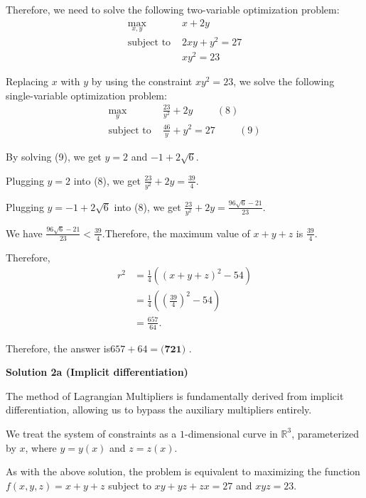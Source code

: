 \begin{enumerate}
 Therefore, we need to solve the following two-variable optimization problem:\begin{align*}\max_{x,y} \ & x + 2y \\\mbox{subject to } & 2 xy + y^2 = 27 \\& xy^2 = 23\end{align*}


 Replacing $x$ with $y$ by using the constraint $xy^2 = 23$, we solve the following single-variable optimization problem:\begin{align*}\max_y \ &  \frac{23}{y^2} + 2y \hspace{1cm} (8) \\\mbox{subject to } & \frac{46}{y} + y^2 = 27 \hspace{1cm} (9)\end{align*}


 By solving (9), we get $y = 2$ and $-1 + 2 \sqrt{6}$.

 Plugging $y = 2$ into (8), we get $\frac{23}{y^2} + 2y = \frac{39}{4}$.

 Plugging $y = -1 + 2 \sqrt{6}$ into (8), we get $\frac{23}{y^2} + 2y = \frac{96 \sqrt{6} - 21}{23}$.

 We have $\frac{96 \sqrt{6} - 21}{23} < \frac{39}{4}$.Therefore, the maximum value of $x + y + z$ is $\frac{39}{4}$.

 Therefore,\begin{align*}r^2 & = \frac{1}{4} \left( \left( x + y + z \right)^2 - 54 \right) \\& = \frac{1}{4} \left( \left( \frac{39}{4} \right)^2 - 54 \right) \\& = \frac{657}{64} .\end{align*}


 Therefore, the answer is$657 + 64 = \boxed{\textbf{(721) }}$.

 



\textbf{Solution 2a (Implicit differentiation)}

The method of Lagrangian Multipliers is fundamentally derived from implicit differentiation, allowing us to bypass the auxiliary multipliers entirely.

 We treat the system of constraints as a $1$-dimensional curve in $\mathbb{R}^{3}$, parameterized by $x$, where $y = y(x)$ and $z = z(x)$.

 As with the above solution, the problem is equivalent to maximizing the function $f(x,y,z)=x+y+z$ subject to $xy+yz+zx=27$ and $xyz=23$.


\end{enumerate}
